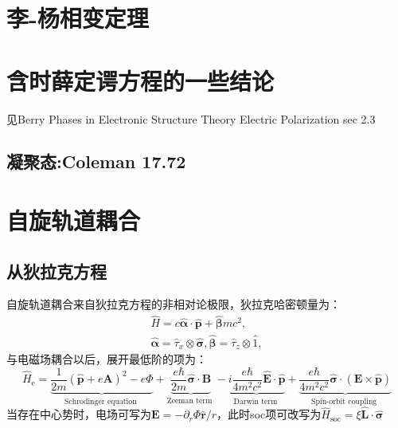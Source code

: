 \documentclass[10pt,openany]{book}
\theoremstyle{thmstyle} %
\theoremstyle{defstyle} %
\theoremstyle{prostyle} %
\begin{document}
\section{李-杨相变定理}
\section{含时薛定谔方程的一些结论}
见Berry Phases in Electronic Structure Theory Electric Polarization sec 2.3
\subsection{凝聚态:Coleman 17.72}
\section{自旋轨道耦合}
\subsection{从狄拉克方程}
自旋轨道耦合来自狄拉克方程的非相对论极限，狄拉克哈密顿量为：
\begin{equation}
  \begin{gathered}
    \hat{H}=c \hat{\boldsymbol{\alpha}} \cdot \hat{\mathbf{p}}+\hat{\boldsymbol{\beta}} m c^2, \\
    \hat{\boldsymbol{\alpha}}=\hat{\tau}_x \otimes \hat{\boldsymbol{\sigma}}, \hat{\boldsymbol{\beta}}=\hat{\tau}_z \otimes \hat{1},
    \end{gathered}
\end{equation}
与电磁场耦合以后，展开最低阶的项为：
\begin{equation}
  \hat{H}_{\mathrm{e}}=\underbrace{\frac{1}{2 m}(\hat{\mathbf{p}}+e \mathbf{A})^2-e \Phi}_{\text {Schrodinger equation }}+\underbrace{\frac{e \hbar}{2 m} \hat{\boldsymbol{\sigma}} \cdot \mathbf{B}}_{\text {Zeeman term }}-\underbrace{i \frac{e \hbar}{4 m^2 c^2} \hat{\mathbf{E}} \cdot \hat{\mathbf{p}}}_{\text {Darwin term }}+\underbrace{\frac{e \hbar}{4 m^2 c^2} \hat{\boldsymbol{\sigma}} \cdot(\mathbf{E} \times \hat{\mathbf{p}})}_{\text {Spin-orbit coupling }}
\end{equation}
当存在中心势时，电场可写为$ \mathbf{E}=-\partial_r \Phi \hat{\mathbf{r}} / r $，此时soc项可改写为$ \hat{H}_{\mathrm{soc}}=\xi \hat{\mathbf{L}} \cdot \hat{\boldsymbol{\sigma}} $
\end{document}
